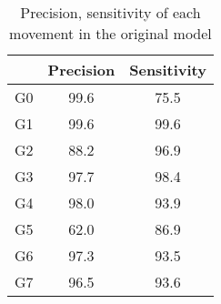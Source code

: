 \begin{longtable}{ccc}
\caption{Precision, sensitivity of each movement in the original model}
\label{tab:my-table}\\
\hline
   & Precision & Sensitivity \\ \hline
\endfirsthead
%
\endhead
%
G0 & 99.6      & 75.5        \\ \cline{1-1}
G1 & 99.6      & 99.6        \\ \cline{1-1}
G2 & 88.2      & 96.9        \\ \cline{1-1}
G3 & 97.7      & 98.4        \\ \cline{1-1}
G4 & 98.0      & 93.9        \\ \cline{1-1}
G5 & 62.0      & 86.9        \\ \cline{1-1}
G6 & 97.3      & 93.5        \\ \cline{1-1}
G7 & 96.5      & 93.6        \\ \hline
\end{longtable}